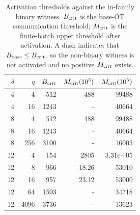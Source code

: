 \begin{table}
\centering
\small
\caption{Activation thresholds against the in-family binary witness. $B_{\rm crit}$ is the base-OT communication threshold; $M_{\rm crit}$ is the finite-batch upper threshold after activation. A dash indicates that $B_{\rm base}\leq B_{\rm crit}$, so the non-binary witness is not activated and no positive $M_{\rm crit}$ exists.}
\label{tab:critical-thresholds}
\begin{tabular}{rrrrr}
\toprule
$\delta$ & $q$ & $B_{\rm crit}$ & $M_{\rm crit}(10^3)$ & $M_{\rm crit}(10^5)$ \\
\midrule
4 & 4 & 512 & 488 & 99488 \\
4 & 16 & 1243 & - & 40664 \\
8 & 4 & 512 & 488 & 99488 \\
8 & 16 & 1243 & - & 40664 \\
8 & 256 & 3100 & - & 16003 \\
12 & 4 & 154 & 2805 & 3.31e+05 \\
12 & 8 & 966 & 18.26 & 53010 \\
12 & 16 & 957 & 23.12 & 53000 \\
12 & 64 & 1503 & - & 34718 \\
12 & 4096 & 3736 & - & 13623 \\
\bottomrule
\end{tabular}
\end{table}
